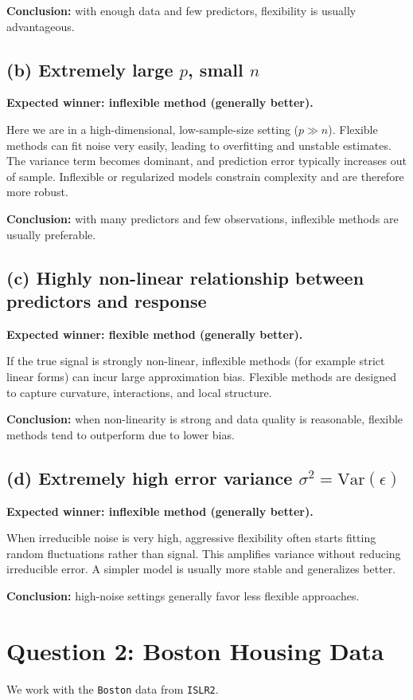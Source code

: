 \documentclass[12pt]{article}
\begin{document}
\textbf{Conclusion:} with enough data and few predictors, flexibility is usually advantageous.

\subsection*{(b) Extremely large $p$, small $n$}
\textbf{Expected winner: inflexible method (generally better).}

Here we are in a high-dimensional, low-sample-size setting ($p \gg n$). Flexible methods can fit noise very easily, leading to overfitting and unstable estimates. The variance term becomes dominant, and prediction error typically increases out of sample. Inflexible or regularized models constrain complexity and are therefore more robust.

\textbf{Conclusion:} with many predictors and few observations, inflexible methods are usually preferable.

\subsection*{(c) Highly non-linear relationship between predictors and response}
\textbf{Expected winner: flexible method (generally better).}

If the true signal is strongly non-linear, inflexible methods (for example strict linear forms) can incur large approximation bias. Flexible methods are designed to capture curvature, interactions, and local structure.

\textbf{Conclusion:} when non-linearity is strong and data quality is reasonable, flexible methods tend to outperform due to lower bias.

\subsection*{(d) Extremely high error variance $\sigma^2 = \mathrm{Var}(\epsilon)$}
\textbf{Expected winner: inflexible method (generally better).}

When irreducible noise is very high, aggressive flexibility often starts fitting random fluctuations rather than signal. This amplifies variance without reducing irreducible error. A simpler model is usually more stable and generalizes better.

\textbf{Conclusion:} high-noise settings generally favor less flexible approaches.

\section*{Question 2: Boston Housing Data}
We work with the \texttt{Boston} data from \texttt{ISLR2}.
\end{document}
